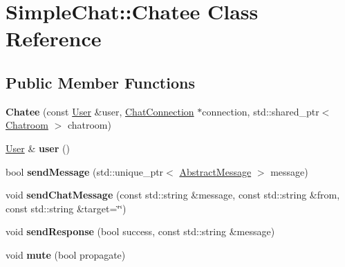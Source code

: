 \hypertarget{classSimpleChat_1_1Chatee}{\section{Simple\-Chat\-:\-:Chatee Class Reference}
\label{classSimpleChat_1_1Chatee}
}
\subsection*{Public Member Functions}
\begin{DoxyCompactItemize}
\item 
\hypertarget{classSimpleChat_1_1Chatee_aa83e4ea06b6ff0ec85410c1abb2cc62b}{{\bfseries Chatee} (const \hyperlink{classSimpleChat_1_1User}{User} \&user, \hyperlink{classSimpleChat_1_1ChatConnection}{Chat\-Connection} $\ast$connection, std\-::shared\-\_\-ptr$<$ \hyperlink{classSimpleChat_1_1Chatroom}{Chatroom} $>$ chatroom)}\label{classSimpleChat_1_1Chatee_aa83e4ea06b6ff0ec85410c1abb2cc62b}

\item 
\hypertarget{classSimpleChat_1_1Chatee_a7fbd4397978d0c603a9a485ad78d60ba}{\hyperlink{classSimpleChat_1_1User}{User} \& {\bfseries user} ()}\label{classSimpleChat_1_1Chatee_a7fbd4397978d0c603a9a485ad78d60ba}

\item 
\hypertarget{classSimpleChat_1_1Chatee_a50dd83ccddcb599fc6a9ed0dfb7f5f1e}{bool {\bfseries send\-Message} (std\-::unique\-\_\-ptr$<$ \hyperlink{classSimpleChat_1_1AbstractMessage}{Abstract\-Message} $>$ message)}\label{classSimpleChat_1_1Chatee_a50dd83ccddcb599fc6a9ed0dfb7f5f1e}

\item 
\hypertarget{classSimpleChat_1_1Chatee_a4678783008a283355896b32643b881bc}{void {\bfseries send\-Chat\-Message} (const std\-::string \&message, const std\-::string \&from, const std\-::string \&target=\char`\"{}\char`\"{})}\label{classSimpleChat_1_1Chatee_a4678783008a283355896b32643b881bc}

\item 
\hypertarget{classSimpleChat_1_1Chatee_ab06c30e73c50b3f0daa55834fc160e96}{void {\bfseries send\-Response} (bool success, const std\-::string \&message)}\label{classSimpleChat_1_1Chatee_ab06c30e73c50b3f0daa55834fc160e96}

\item 
\hypertarget{classSimpleChat_1_1Chatee_afe41bc771c6ed37cb46e05d81e8f8167}{void {\bfseries mute} (bool propagate)}\label{classSimpleChat_1_1Chatee_afe41bc771c6ed37cb46e05d81e8f8167}


\end{DoxyCompactItemize}

